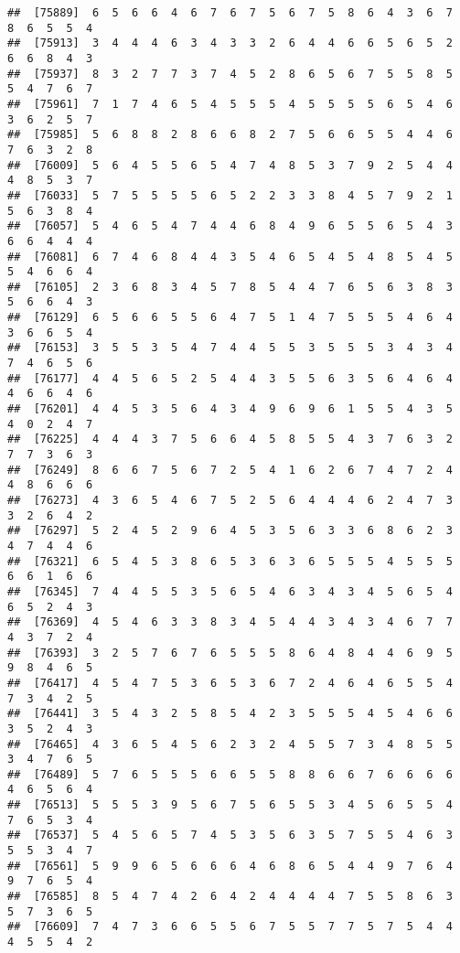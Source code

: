 \documentclass[
]{book}
\begin{document}
\begin{verbatim}
##  [75889]  6  5  6  6  4  6  7  6  7  5  6  7  5  8  6  4  3  6  7  8  6  5  5  4
##  [75913]  3  4  4  4  6  3  4  3  3  2  6  4  4  6  6  5  6  5  2  6  6  8  4  3
##  [75937]  8  3  2  7  7  3  7  4  5  2  8  6  5  6  7  5  5  8  5  5  4  7  6  7
##  [75961]  7  1  7  4  6  5  4  5  5  5  4  5  5  5  5  6  5  4  6  3  6  2  5  7
##  [75985]  5  6  8  8  2  8  6  6  8  2  7  5  6  6  5  5  4  4  6  7  6  3  2  8
##  [76009]  5  6  4  5  5  6  5  4  7  4  8  5  3  7  9  2  5  4  4  4  8  5  3  7
##  [76033]  5  7  5  5  5  5  6  5  2  2  3  3  8  4  5  7  9  2  1  5  6  3  8  4
##  [76057]  5  4  6  5  4  7  4  4  6  8  4  9  6  5  5  6  5  4  3  6  6  4  4  4
##  [76081]  6  7  4  6  8  4  4  3  5  4  6  5  4  5  4  8  5  4  5  5  4  6  6  4
##  [76105]  2  3  6  8  3  4  5  7  8  5  4  4  7  6  5  6  3  8  3  5  6  6  4  3
##  [76129]  6  5  6  6  5  5  6  4  7  5  1  4  7  5  5  5  4  6  4  3  6  6  5  4
##  [76153]  3  5  5  3  5  4  7  4  4  5  5  3  5  5  5  3  4  3  4  7  4  6  5  6
##  [76177]  4  4  5  6  5  2  5  4  4  3  5  5  6  3  5  6  4  6  4  4  6  6  4  6
##  [76201]  4  4  5  3  5  6  4  3  4  9  6  9  6  1  5  5  4  3  5  4  0  2  4  7
##  [76225]  4  4  4  3  7  5  6  6  4  5  8  5  5  4  3  7  6  3  2  7  7  3  6  3
##  [76249]  8  6  6  7  5  6  7  2  5  4  1  6  2  6  7  4  7  2  4  4  8  6  6  6
##  [76273]  4  3  6  5  4  6  7  5  2  5  6  4  4  4  6  2  4  7  3  3  2  6  4  2
##  [76297]  5  2  4  5  2  9  6  4  5  3  5  6  3  3  6  8  6  2  3  4  7  4  4  6
##  [76321]  6  5  4  5  3  8  6  5  3  6  3  6  5  5  5  4  5  5  5  6  6  1  6  6
##  [76345]  7  4  4  5  5  3  5  6  5  4  6  3  4  3  4  5  6  5  4  6  5  2  4  3
##  [76369]  4  5  4  6  3  3  8  3  4  5  4  4  3  4  3  4  6  7  7  4  3  7  2  4
##  [76393]  3  2  5  7  6  7  6  5  5  5  8  6  4  8  4  4  6  9  5  9  8  4  6  5
##  [76417]  4  5  4  7  5  3  6  5  3  6  7  2  4  6  4  6  5  5  4  7  3  4  2  5
##  [76441]  3  5  4  3  2  5  8  5  4  2  3  5  5  5  4  5  4  6  6  3  5  2  4  3
##  [76465]  4  3  6  5  4  5  6  2  3  2  4  5  5  7  3  4  8  5  5  3  4  7  6  5
##  [76489]  5  7  6  5  5  5  6  6  5  5  8  8  6  6  7  6  6  6  6  4  6  5  6  4
##  [76513]  5  5  5  3  9  5  6  7  5  6  5  5  3  4  5  6  5  5  4  7  6  5  3  4
##  [76537]  5  4  5  6  5  7  4  5  3  5  6  3  5  7  5  5  4  6  3  5  5  3  4  7
##  [76561]  5  9  9  6  5  6  6  6  4  6  8  6  5  4  4  9  7  6  4  9  7  6  5  4
##  [76585]  8  5  4  7  4  2  6  4  2  4  4  4  4  7  5  5  8  6  3  5  7  3  6  5
##  [76609]  7  4  7  3  6  6  5  5  6  7  5  5  7  7  5  7  5  4  4  4  5  5  4  2

\end{verbatim}
\end{document}
